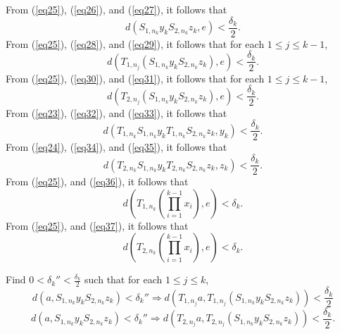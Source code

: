 \documentclass[12pt,a4paper]{amsart}
\theoremstyle{plain}
\theoremstyle{definition}
\theoremstyle{remark}
\theoremstyle{fact}
\begin{document}
    
    
    
    
    
    
    From (\ref{eq25}), (\ref{eq26}), and (\ref{eq27}), it follows that
    \begin{equation}\label{eq38}
        d(S_{1, n_k}y_kS_{2, n_k}z_k,e)<\frac{\delta_k}{2}.
    \end{equation}
    From (\ref{eq25}), (\ref{eq28}), and (\ref{eq29}), it follows that for each $1\leq j\leq k-1$,
    \begin{equation}\label{eq39}
       d(T_{1, n_j}(S_{1, n_k}y_kS_{2, n_k}z_k),e)<\frac{\delta_k}{2}.
    \end{equation}
     From (\ref{eq25}), (\ref{eq30}), and (\ref{eq31}), it follows that for each $1\leq j\leq k-1$,
     \begin{equation}\label{eq40}
     d(T_{2, n_j}(S_{1, n_k}y_kS_{2, n_k}z_k),e)<\frac{\delta_k}{2}.
    \end{equation}
    From  (\ref{eq23}), (\ref{eq32}), and (\ref{eq33}), it follows that
    \begin{equation}\label{eq41}
    d(T_{1, n_k}S_{1, n_k}y_kT_{1, n_k}S_{2, n_k}z_k,y_k)<\frac{\delta_k}{2}.
    \end{equation}
   From (\ref{eq24}), (\ref{eq34}), and (\ref{eq35}), it follows that
    \begin{equation}\label{eq42}
d(T_{2, n_k}S_{1, n_k}y_kT_{2, n_k}S_{2, n_k}z_k,z_k)<\frac{\delta_k}{2}.
    \end{equation}
    From (\ref{eq25}), and (\ref{eq36}),  it follows that
    \begin{equation}\label{eq43}
        d(T_{1, n_k}(\prod_{i=1}^{k-1}x_i),e)<\delta_k.
    \end{equation}
    From (\ref{eq25}), and (\ref{eq37}), it follows that
    \begin{equation}\label{eq44}
      d(T_{2, n_k}(\prod_{i=1}^{k-1}x_i),e)<\delta_k.
    \end{equation}

    Find $0<\delta_k''<\frac{\delta_k}{2}$ such that for each $1\leq j\leq k$,
    \begin{equation}\label{eq45}
        d(a,S_{1, n_k}y_kS_{2, n_k}z_k)<\delta_k'' \Rightarrow d(T_{1, n_j}a, T_{1, n_j}(S_{1, n_k}y_kS_{2, n_k}z_k))<\frac{\delta_k}{2}
    \end{equation}
    \begin{equation}\label{eq46}
       d(a,S_{1, n_k}y_kS_{2, n_k}z_k)<\delta_k'' \Rightarrow d(T_{2, n_j}a, T_{2, n_j}(S_{1, n_k}y_kS_{2, n_k}z_k))<\frac{\delta_k}{2}.
    \end{equation}
\end{document}
